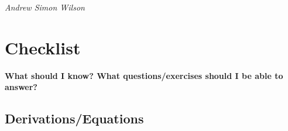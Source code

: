 \documentclass[colorlinks,11pt,a4paper,normalphoto,withhyper,ragged2e]{altareport}
\begin{document}
\hspace{1cm}\textit{Andrew Simon Wilson}
{} %


\pagebreak
	

\section{Checklist}
	{\hspace{0.25cm}\textbf{\color{heading}\Large What should I know? What questions/exercises should I be able to answer?}}
	
	
	\subsection{Derivations/Equations}
	
\end{document}
